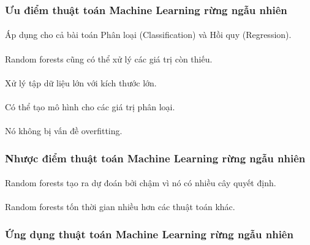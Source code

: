 \documentclass{article}
\begin{document}
\paragraph{}
\paragraph{}
\paragraph{}
\subsubsection{Ưu điểm thuật toán Machine Learning rừng ngẫu nhiên}
\paragraph{}Áp dụng cho cả bài toán Phân loại (Classification) và Hồi quy (Regression).
\paragraph{}Random forests cũng có thể xử lý các giá trị còn thiếu.
\paragraph{}Xử lý tập dữ liệu lớn với kích thước lớn.
\paragraph{}Có thể tạo mô hình cho các giá trị phân loại.
\paragraph{}Nó không bị vấn đề overfitting.
\subsubsection{Nhược điểm thuật toán Machine Learning rừng ngẫu nhiên}
\paragraph{}Random forests tạo ra dự đoán bởi chậm vì nó có nhiều cây quyết định.
\paragraph{} Random forests tốn thời gian nhiều hơn các thuật toán khác.
\subsubsection{Ứng dụng thuật toán Machine Learning rừng ngẫu nhiên}
\end{document}

